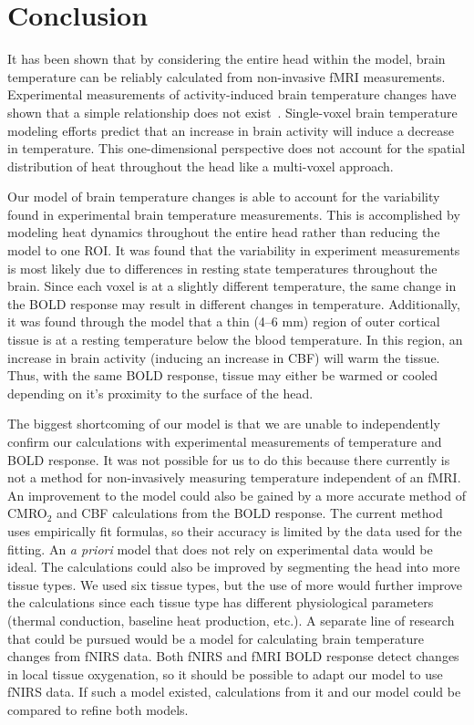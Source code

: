 \chapter{Conclusion}

It has been shown that by considering the entire head within the model, brain temperature can be reliably calculated from non-invasive fMRI measurements. Experimental measurements of activity-induced brain temperature changes have shown that a simple relationship does not exist~\citep{mcelligott,kiyatkin,zeschke,george,tachibana}. Single-voxel brain temperature modeling efforts predict that an increase in brain activity will induce a decrease in temperature. This one-dimensional perspective does not account for the spatial distribution of heat throughout the head like a multi-voxel approach.

Our model of brain temperature changes is able to account for the variability found in experimental brain temperature measurements.  This is accomplished by modeling heat dynamics throughout the entire head rather than reducing the model to one ROI.  It was found that the variability in experiment measurements is most likely due to differences in resting state temperatures throughout the brain.  Since each voxel is at a slightly different temperature, the same change in the BOLD response may result in different changes in temperature. Additionally, it was found through the model that a thin (4--6 mm) region of outer cortical tissue is at a resting temperature below the blood temperature.  In this region, an increase in brain activity (inducing an increase in CBF) will warm the tissue.  Thus, with the same BOLD response, tissue may either be warmed or cooled depending on it's proximity to the surface of the head.

The biggest shortcoming of our model is that we are unable to independently confirm our calculations with experimental measurements of temperature and BOLD response. It was not possible for us to do this because there currently is not a method for non-invasively measuring temperature independent of an fMRI. An improvement to the model could also be gained by a more accurate method of CMRO$_2$ and CBF calculations from the BOLD response. The current method uses empirically fit formulas, so their accuracy is limited by the data used for the fitting. An \textit{a priori} model that does not rely on experimental data would be ideal. The calculations could also be improved by segmenting the head into more tissue types.  We used six tissue types, but the use of more would further improve the calculations since each tissue type has different physiological parameters (thermal conduction, baseline heat production, etc.). A separate line of research that could be pursued would be a model for calculating brain temperature changes from fNIRS data. Both fNIRS and fMRI BOLD response detect changes in local tissue oxygenation, so it should be possible to adapt our model to use fNIRS data. If such a model existed, calculations from it and our model could be compared to refine both models.

